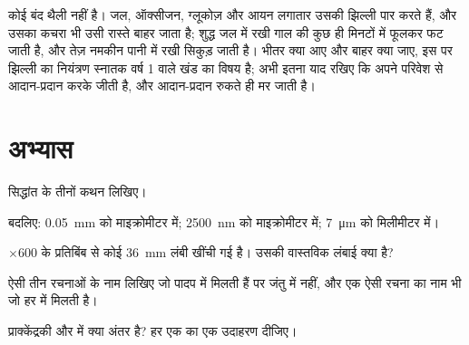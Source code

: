 \begin{remark}[खुले तंत्र के रूप में कोशिका]\label{rem:g10:cells-common-unit:open}
 कोई बंद थैली नहीं है। जल, ऑक्सीजन, ग्लूकोज़ और आयन लगातार उसकी
झिल्ली पार करते हैं, और उसका कचरा भी उसी रास्ते बाहर जाता है; शुद्ध जल
में रखी गाल की  कुछ ही मिनटों में फूलकर फट जाती है, और तेज़ नमकीन
पानी में रखी  सिकुड़ जाती है। भीतर क्या आए और बाहर क्या जाए, इस पर
झिल्ली का नियंत्रण स्नातक वर्ष 1 वाले खंड का विषय है; अभी इतना याद रखिए
कि  अपने परिवेश से आदान-प्रदान करके जीती है, और आदान-प्रदान रुकते
ही मर जाती है।
\end{remark}

\section{अभ्यास}

\begin{exercise}[$\star$]\label{exo:g10:cells-common-unit:1}
 सिद्धांत के तीनों कथन लिखिए।
\end{exercise}

\begin{exercise}[$\star$]\label{exo:g10:cells-common-unit:2}
बदलिए: \qty{0.05}{mm} को माइक्रोमीटर में; \qty{2500}{nm} को माइक्रोमीटर
में; \qty{7}{\micro m} को मिलीमीटर में।
\end{exercise}

\begin{exercise}[$\star$]\label{exo:g10:cells-common-unit:3}
$\times 600$ के प्रतिबिंब से कोई  \qty{36}{mm} लंबी खींची गई है।
उसकी वास्तविक लंबाई क्या है?
\end{exercise}

\begin{exercise}[$\star$]\label{exo:g10:cells-common-unit:4}
ऐसी तीन रचनाओं के नाम लिखिए जो पादप  में मिलती हैं पर जंतु 
में नहीं, और एक ऐसी रचना का नाम भी जो हर  में मिलती है।
\end{exercise}

\begin{exercise}[$\star$]\label{exo:g10:cells-common-unit:5}
प्राक्केंद्रकी और  में क्या अंतर है? हर एक का एक
उदाहरण दीजिए।
\end{exercise}

